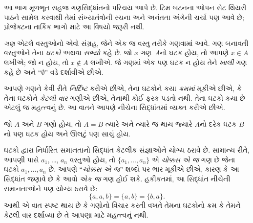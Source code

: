 
\label{guunit:OLP-0003}


\begin{editorial}
  આ ભાગ મૂળભૂત સહજ ગણસિદ્ધાંતનો પરિચય આપે છે.
  ટિમ બટનના ઓપન સેટ થિયરી પાઠને સામેલ કરવાથી તેમાં
  સંખ્યાતંત્રોની રચના અને અનંતતા અંગેની ચર્ચા પણ આવે છે;
  પ્રોજેક્ટના તાર્કિક ભાગો માટે આ વિષયો જરૂરી નથી.
\end{editorial}

\begingroup
\makeatletter{}\makeatother

\label{guunit:OLP-0004}


\begingroup
\makeatletter{}\makeatother

\label{guunit:OLP-0005}


\emph{ગણ} એટલે વસ્તુઓનો એવો સંગ્રહ, જેને {એક જ} વસ્તુ તરીકે ગણવામાં આવે.
ગણ બનાવતી વસ્તુઓને તેના \emph{ઘટકો} અથવા \emph{સભ્યો} કહે છે.
જો $x$ ગણ~$A$નો ઘટક હોય, તો આપણે $x \in A$ લખીએ;
જો ન હોય, તો $x \notin A$ લખીએ. જે ગણમાં એક પણ ઘટક ન હોય
તેને \emph{ખાલી} ગણ કહે છે અને “$\emptyset$” વડે દર્શાવીએ છીએ.

\begin{explain}
આપણે ગણને કેવી રીતે \emph{નિર્દિષ્ટ} કરીએ છીએ, તેના ઘટકોને
કયા \emph{ક્રમમાં} મૂકીએ છીએ, કે તેના ઘટકોને \emph{કેટલી વાર}
ગણીએ છીએ, તેનાથી કોઈ ફરક પડતો નથી. તેના ઘટકો કયા છે એટલું જ
મહત્ત્વનું છે. આ વાતને આપણે નીચેના સિદ્ધાંતમાં વ્યક્ત કરીએ છીએ.
\end{explain}

\begin{defn}[ઘટકો દ્વારા નિર્ધારિત સમાનતા]
જો $A$ અને $B$ ગણો હોય, તો $A = B$ ત્યારે અને ત્યારે જ થાય જ્યારે
$A$નો દરેક ઘટક $B$નો પણ ઘટક હોય અને ઊલટું પણ સાચું હોય.
\end{defn}

ઘટકો દ્વારા નિર્ધારિત સમાનતાનો સિદ્ધાંત કેટલીક સંજ્ઞાઓને યોગ્ય ઠરાવે છે.
સામાન્ય રીતે, આપણી પાસે $a_{1}$, \dots, $a_{n}$ વસ્તુઓ હોય, તો
$\{a_{1}, \dots, a_{n}\}$ એ \emph{ચોક્કસ એ જ} ગણ છે જેના ઘટકો
$a_1, \ldots, a_n$ છે. આપણે “\emph{ચોક્કસ એ જ}” શબ્દો પર ભાર મૂકીએ છીએ,
કારણ કે આ સિદ્ધાંત જણાવે છે કે આવો \emph{એક જ} ગણ હોઈ શકે.
હકીકતમાં, આ સિદ્ધાંત નીચેની સમાનતાઓને પણ યોગ્ય ઠરાવે છે:
  \[
    \{a, a, b\} = \{a, b\} = \{b,a\}.
  \]
આથી એ વાત સ્પષ્ટ થાય છે કે ગણોનો વિચાર કરતી વખતે તેમના ઘટકોનો
ક્રમ કે તેમને કેટલી વાર દર્શાવ્યા છે તે આપણા માટે મહત્ત્વનું નથી.

